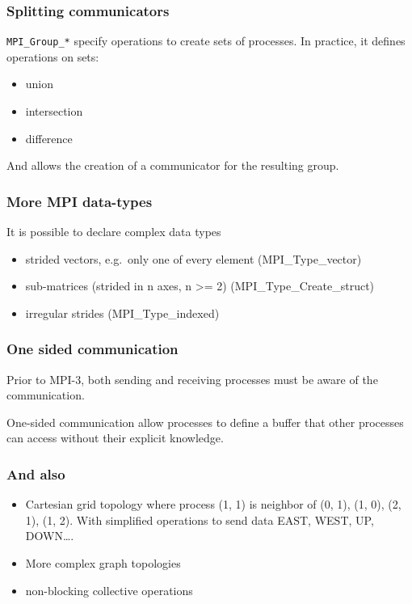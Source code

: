 \subsubsection{Splitting communicators}\label{splitting-communicators}

\texttt{MPI\_Group\_*} specify operations to create sets of processes.
In practice, it defines operations on sets:

\begin{itemize}
\itemsep1pt\parskip0pt
\item
  union
\item
  intersection
\item
  difference
\end{itemize}

And allows the creation of a communicator for the resulting group.

\subsubsection{More MPI data-types}\label{more-mpi-data-types}

It is possible to declare complex data types

\begin{itemize}
\itemsep1pt\parskip0pt
\item
  strided vectors, e.g.~only one of every element (MPI\_Type\_vector)
\item
  sub-matrices (strided in n axes, n \textgreater{}= 2)
  (MPI\_Type\_Create\_struct)
\item
  irregular strides (MPI\_Type\_indexed)
\end{itemize}

\subsubsection{One sided communication}\label{one-sided-communication}

Prior to MPI-3, both sending and receiving processes must be aware of
the communication.

One-sided communication allow processes to define a buffer that other
processes can access without their explicit knowledge.

\subsubsection{And also}\label{and-also}

\begin{itemize}
\itemsep1pt\parskip0pt
\item
  Cartesian grid topology where process (1, 1) is neighbor of (0, 1),
  (1, 0), (2, 1), (1, 2). With simplified operations to send data EAST,
  WEST, UP, DOWN\ldots{}.
\item
  More complex graph topologies
\item
  non-blocking collective operations
\end{itemize}

